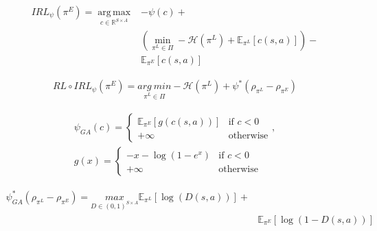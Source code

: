 \begin{equation}
    \label{formula:regularized_max_ent}
    \begin{aligned}
        IRL_{\psi}(\pi^{E}) = \underset{c \in \mathbb{R}^{S \times A}}{\operatorname{arg\,max}} &  - \psi(c) +  \\
        & \left(\underset{\pi^{L} \in \Pi}{\min} -\mathcal{H}(\pi^{L}) + \mathbb{E}_{\pi^{L}} \left [ c(s,a) \right ]\right) - \\
        &  \mathbb{E}_{\pi^{E}} \left [ c(s,a) \right ]
    \end{aligned}
\end{equation}

\begin{equation}
    \label{formula:policy_characterization}
    \begin{aligned}
    RL \circ IRL_{\psi}(\pi^{E}) = \underset{\pi^{L} \in \Pi}{arg \ min}-\mathcal{H}(\pi^{L}) + \psi^{*}(\rho_{\pi^{L}} - \rho_{\pi^{E}}) 
    \end{aligned}
\end{equation}

\begin{equation}
    \label{formula:ga_regularization}
    \begin{split}
    \psi_{GA}(c) = \left\{
    \begin{matrix}
        \mathbb{E}_{\pi^{E}}\left[ g(c(s,a)) \right] & \text{if } c < 0\\ 
        +\infty & \text{otherwise}
    \end{matrix}
    \right.,
    \\
    g(x) = \left\{
    \begin{matrix}
        -x - \log(1- e^{x}) & \text{if } c < 0\\ 
        +\infty & \text{otherwise}
    \end{matrix}
    \right.
    \end{split}
\end{equation}

\begin{equation}
    \begin{split}
    \label{formula:ga_regularizer_conjugate}
    \psi^{*}_{GA}(\rho_{\pi^{L}} - \rho_{\pi^{E}}) = \underset{D\in(0,1)^{S \times A}}{max} \mathbb{E}_{\pi^{L}}\left [ \log(D(s,a))\right ] + \\ 
    & \mathbb{E}_{\pi^{E}}\left [ \log(1 - D(s,a))\right ]
    \end{split}
\end{equation}